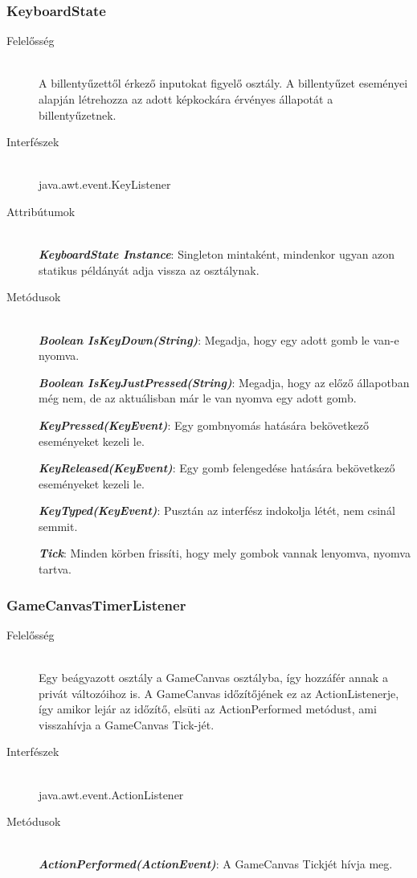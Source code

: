 \subsubsection{KeyboardState}
	\begin{description}
	\item[Felelősség] \hfill \\
	A billentyűzettől érkező inputokat figyelő osztály. A billentyűzet eseményei alapján létrehozza az adott képkockára érvényes állapotát a billentyűzetnek.
	
	\item[Interfészek] \hfill \\
	java.awt.event.KeyListener
	\item[Attribútumok] \hfill \\
	\textbf{\emph{KeyboardState Instance}}: Singleton mintaként, mindenkor ugyan azon statikus példányát adja vissza az osztálynak.
	\item[Metódusok] \hfill \\
	\textbf{\emph{Boolean IsKeyDown(String)}}: Megadja, hogy egy adott gomb le van-e nyomva.
	
	\textbf{\emph{Boolean IsKeyJustPressed(String)}}: Megadja, hogy az előző állapotban még nem, de az aktuálisban már le van nyomva egy adott gomb.

	\textbf{\emph{KeyPressed(KeyEvent)}}: Egy gombnyomás hatására bekövetkező eseményeket kezeli le.

	\textbf{\emph{KeyReleased(KeyEvent)}}: Egy gomb felengedése hatására bekövetkező eseményeket kezeli le.

	\textbf{\emph{KeyTyped(KeyEvent)}}: Pusztán az interfész indokolja létét, nem csinál semmit.
	
	\textbf{\emph{Tick}}: Minden körben frissíti, hogy mely gombok vannak lenyomva, nyomva tartva.
	\end{description}
	
\subsubsection{GameCanvasTimerListener}
	\begin{description}
	\item[Felelősség] \hfill \\
	Egy beágyazott osztály a GameCanvas osztályba, így hozzáfér annak a privát változóihoz is.  A GameCanvas időzítőjének ez az ActionListenerje, így amikor lejár az időzítő, elsüti az ActionPerformed metódust, ami visszahívja a GameCanvas Tick-jét.
	
	\item[Interfészek] \hfill \\
	java.awt.event.ActionListener
	\item[Metódusok] \hfill \\
	\textbf{\emph{ActionPerformed(ActionEvent)}}: A GameCanvas Tickjét hívja meg.
	\end{description}
	
